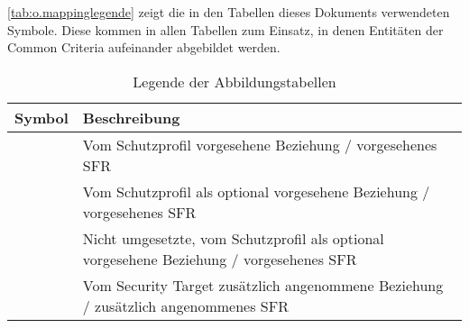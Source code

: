 
\autoref{tab:o.mappinglegende} zeigt die in den Tabellen dieses
Dokuments verwendeten Symbole. Diese kommen in allen Tabellen zum
Einsatz, in denen Entitäten der Common Criteria aufeinander abgebildet
werden.

\begin{table}[ht]
  \centering
  \begin{tabularx}{0.75\linewidth}[c]{cX}
    \toprule
    Symbol & Beschreibung\\ \midrule
    \tcheck{} & Vom Schutzprofil vorgesehene Beziehung / vorgesehenes SFR \\
    \toptio{} & Vom Schutzprofil als optional vorgesehene Beziehung / vorgesehenes SFR\\
    \tdrop{} & Nicht umgesetzte, vom Schutzprofil als optional vorgesehene Beziehung / vorgesehenes SFR\\
    \tadded{} & Vom Security Target zusätzlich angenommene Beziehung / zusätzlich angenommenes SFR\\
    \bottomrule
  \end{tabularx}
  \hypertarget{tab:o.mappinglegende}{\caption{Legende der Abbildungstabellen}}
  \label{tab:o.mappinglegende}
\end{table}




